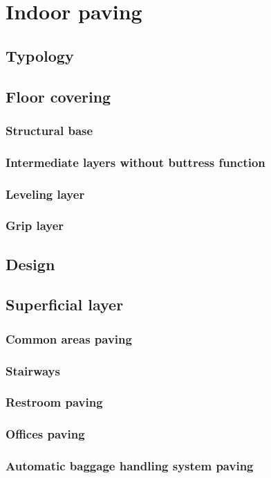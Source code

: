 \chapter{Indoor paving}

	\section{Typology}
	
	\section{Floor covering}
		\subsection{Structural base}
		\subsection{Intermediate layers without buttress function}
		\subsection{Leveling layer}
		\subsection{Grip layer}
		
	\section{Design}
	
	\section{Superficial layer}
		\subsection{Common areas paving}
		\subsection{Stairways}
		\subsection{Restroom paving}
		\subsection{Offices paving}
		\subsection{Automatic baggage handling system paving}
		
		
		